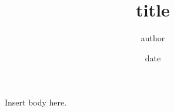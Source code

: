 \documentclass[10pt,letterpaper]{article}   %
\title{title}
\author{author} %
\date{date} %
\begin{document}
\maketitle
Insert body here. 
\end{document}
